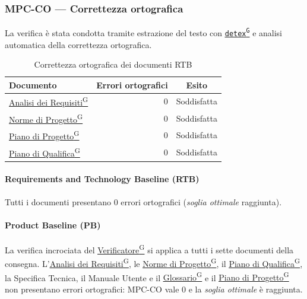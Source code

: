 \documentclass[a4paper,12pt]{article}
\providecommand{\glslink}[2]{\href{https://alittlebyte-19.github.io/Documentazione/glossario.html\#gls-#1}{\underline{#2}\textsuperscript{\scriptsize G}}}
\begin{document}
\subsubsection{MPC-CO — Correttezza ortografica}

La verifica è stata condotta tramite estrazione del testo con \texttt{\glslink{detex}{detex}} e analisi automatica della correttezza ortografica.

\begin{table}[H]
\centering
{}
\begin{tabular}{|l|r|c|}
    \hline
    \rowcolor{gray!35}
    \textbf{Documento} & \textbf{Errori ortografici} & \textbf{Esito} \\
    \hline
    \glslink{analisi-dei-requisiti-adr}{Analisi dei Requisiti} & 0 & \textcolor{green!60!black}{Soddisfatta} \\
    \glslink{norme-di-progetto}{Norme di Progetto}     & 0 & \textcolor{green!60!black}{Soddisfatta} \\
    \glslink{piano-di-progetto}{Piano di Progetto}     & 0 & \textcolor{green!60!black}{Soddisfatta} \\
    \glslink{piano-di-qualifica}{Piano di Qualifica}    & 0 & \textcolor{green!60!black}{Soddisfatta} \\
    \hline
\end{tabular}
\caption{Correttezza ortografica dei documenti RTB}
\end{table}

\paragraph*{Requirements and Technology Baseline (RTB)} Tutti i documenti presentano 0 errori ortografici (\emph{soglia ottimale} raggiunta).

\paragraph*{Product Baseline (PB)} La verifica incrociata del \glslink{verificatore}{Verificatore} si applica a tutti i sette documenti della consegna. L'\glslink{analisi-dei-requisiti-adr}{Analisi dei Requisiti}, le \glslink{norme-di-progetto}{Norme di Progetto}, il \glslink{piano-di-qualifica}{Piano di Qualifica}, la Specifica Tecnica, il Manuale Utente e il \glslink{glossario}{Glossario} e il \glslink{piano-di-progetto}{Piano di Progetto} non presentano errori ortografici: MPC-CO vale 0 e la \emph{soglia ottimale} è raggiunta.
\end{document}
